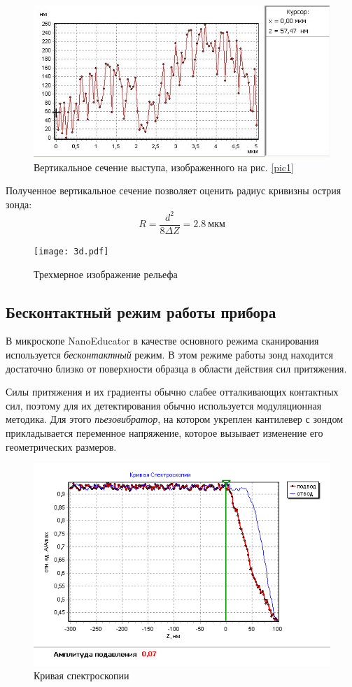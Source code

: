 \documentclass[a4paper, 12pt]{article}
\begin{document}
	\newpage
	\begin{figure}[!htb]
		\centering
		\includegraphics[scale=0.6]{relief1.jpg}
		\caption{Вертикальное сечение выступа, изображенного на рис. \ref{pic1}}
	\end{figure}
	Полученное вертикальное сечение позволяет оценить радиус кривизны острия зонда:
	\begin{equation*}
		R=\frac{d^2}{8\Delta Z}=2.8\ \text{мкм}
	\end{equation*}
	\begin{figure}[!htb]
		\centering
		\texttt{[image: 3d.pdf]}
		\caption{Трехмерное изображение рельефа}
	\end{figure}
	\subsection{Бесконтактный режим работы прибора}
	В микроскопе NanoEducator в качестве основного режима сканирования используется \textit{бесконтактный} режим. В этом режиме работы зонд находится достаточно близко от поверхности образца в области действия сил притяжения.\par
	Силы притяжения и их градиенты обычно слабее отталкивающих контактных сил, поэтому для их детектирования обычно используется модуляционная методика. Для этого \textit{пьезовибратор}, на котором укреплен кантилевер с зондом прикладывается переменное напряжение, которое вызывает изменение его геометрических размеров.
	\begin{figure}[!htb]
		\centering
		\includegraphics[scale=0.7]{spectr1.PNG}
		\caption{Кривая спектроскопии}
	\end{figure}
	\par
\end{document}

